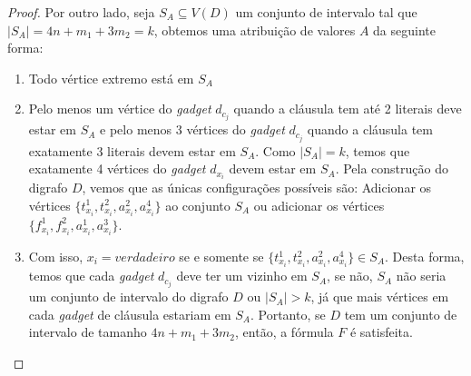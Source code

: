 \begin{theorem}
\begin{proof}
Por outro lado, seja $S_A \subseteq V(D)$ um conjunto de intervalo tal que $|S_A| = 4n+m_1+3m_2 = k$, obtemos uma atribuição de valores $A$ da seguinte forma:
\begin{enumerate}
    \item Todo vértice extremo está em $S_A$
    \item Pelo menos um vértice do \emph{gadget} $d_{c_j}$ quando a cláusula tem até 2 literais deve estar em $S_A$ e pelo menos 3 vértices do \emph{gadget} $d_{c_j}$ quando a cláusula tem exatamente 3 literais devem estar em $S_A$. Como $|S_A| = k$, temos que exatamente 4 vértices do \emph{gadget} $d_{x_i}$ devem estar em $S_A$. Pela construção do digrafo $D$, vemos que as únicas configurações possíveis são: Adicionar os vértices $\{t^1_{x_i},t^2_{x_i},a^2_{x_i},a^4_{x_i}\}$ ao conjunto $S_A$ ou adicionar os vértices $\{f^1_{x_i},f^2_{x_i},a^1_{x_i},a^3_{x_i}\}$.
    \item Com isso, $x_i = verdadeiro$ se e somente se $\{t^1_{x_i},t^2_{x_i},a^2_{x_i},a^4_{x_i}\} \in S_A$. Desta forma, temos que cada \emph{gadget} $d_{c_j}$ deve ter um vizinho em $S_A$, se não, $S_A$ não seria um conjunto de intervalo do digrafo $D$ ou $|S_A| > k$, já que mais vértices em cada \emph{gadget} de cláusula estariam em $S_A$. Portanto, se $D$ tem um conjunto de intervalo de tamanho $4n+m_1+3m_2$, então, a fórmula $F$ é satisfeita.
\end{enumerate}

\end{proof}
\end{theorem}

